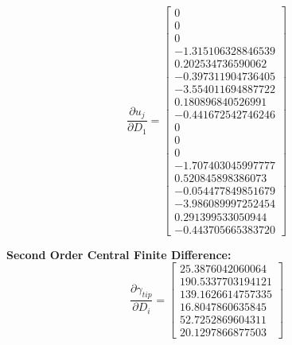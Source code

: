 \documentclass[12pt,parskip=full]{article}
\numberwithin{subsection}{section}
\begin{document}
		\begin{equation}
			\frac{\partial u_j}{\partial D_1} = \begin{bmatrix} 0 \\
                   0 \\
                   0 \\ 
  -1.315106328846539 \\
   0.202534736590062 \\
  -0.397311904736405 \\
  -3.554011694887722 \\
   0.180896840526991 \\
  -0.441672542746246 \\
                   0 \\
                   0 \\
                   0 \\
  -1.707403045997777 \\
   0.520845898386073 \\
  -0.054477849851679 \\
  -3.986089997252454 \\
   0.291399533050944 \\
  -0.443705665383720
   			\end{bmatrix}
		\end{equation}
		
		
		\pagebreak
		\textbf{Second Order Central Finite Difference:}
		\begin{equation}
			\frac{\partial \gamma_{tip}}{\partial D_i} = \begin{bmatrix} 25.3876042060064 \\
   190.5337703194121 \\
   139.1626614757335 \\ 
   16.8047860635845 \\
   52.7252869604311 \\
   20.1297866877503
   			\end{bmatrix}
		\end{equation}
\end{document}
